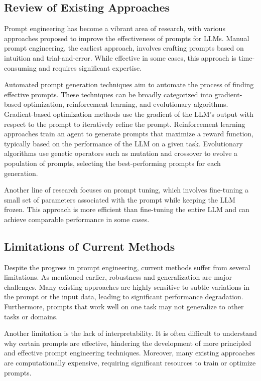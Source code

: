 \documentclass{article}
\begin{document}
\subsection{Review of Existing Approaches}

Prompt engineering has become a vibrant area of research, with various approaches proposed to improve the effectiveness of prompts for LLMs. Manual prompt engineering, the earliest approach, involves crafting prompts based on intuition and trial-and-error. While effective in some cases, this approach is time-consuming and requires significant expertise.

Automated prompt generation techniques aim to automate the process of finding effective prompts. These techniques can be broadly categorized into gradient-based optimization, reinforcement learning, and evolutionary algorithms. Gradient-based optimization methods use the gradient of the LLM's output with respect to the prompt to iteratively refine the prompt. Reinforcement learning approaches train an agent to generate prompts that maximize a reward function, typically based on the performance of the LLM on a given task. Evolutionary algorithms use genetic operators such as mutation and crossover to evolve a population of prompts, selecting the best-performing prompts for each generation.

Another line of research focuses on prompt tuning, which involves fine-tuning a small set of parameters associated with the prompt while keeping the LLM frozen. This approach is more efficient than fine-tuning the entire LLM and can achieve comparable performance in some cases.

\subsection{Limitations of Current Methods}

Despite the progress in prompt engineering, current methods suffer from several limitations. As mentioned earlier, robustness and generalization are major challenges. Many existing approaches are highly sensitive to subtle variations in the prompt or the input data, leading to significant performance degradation. Furthermore, prompts that work well on one task may not generalize to other tasks or domains.

Another limitation is the lack of interpretability. It is often difficult to understand why certain prompts are effective, hindering the development of more principled and effective prompt engineering techniques. Moreover, many existing approaches are computationally expensive, requiring significant resources to train or optimize prompts.
\end{document}

